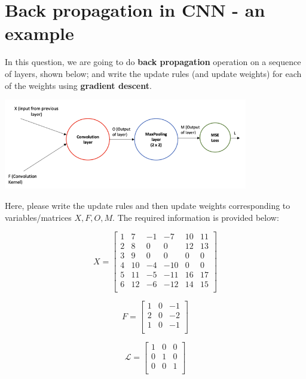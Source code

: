 \section{Back propagation in CNN - an example}

In this question, we are going to do \textbf{back propagation} operation on a sequence of layers, shown below; and write the update rules (and update weights) for each of the weights using \textbf{gradient descent}.

\begin{center}
\includegraphics[width = 0.8\textwidth]{cnn_diagram.png} %
\end{center}

Here, please write the update rules and then update weights corresponding to variables/matrices \(X, F, O, M\). The required information is provided below:

\[
X = \begin{bmatrix}
1 & 7 & -1 & -7 & 10 & 11 \\
2 & 8 & 0 & 0 & 12 & 13 \\
3 & 9 & 0 & 0 & 0 & 0 \\
4 & 10 & -4 & -10 & 0 & 0 \\
5 & 11 & -5 & -11 & 16 & 17 \\
6 & 12 & -6 & -12 & 14 & 15 \\
\end{bmatrix}
\]

\[
F = \begin{bmatrix}
1 & 0 & -1 \\
2 & 0 & -2 \\
1 & 0 & -1 \\
\end{bmatrix}
\]

\[
\mathcal{L} = \begin{bmatrix}
1 & 0 & 0 \\
0 & 1 & 0 \\
0 & 0 & 1 \\
\end{bmatrix}
\]

